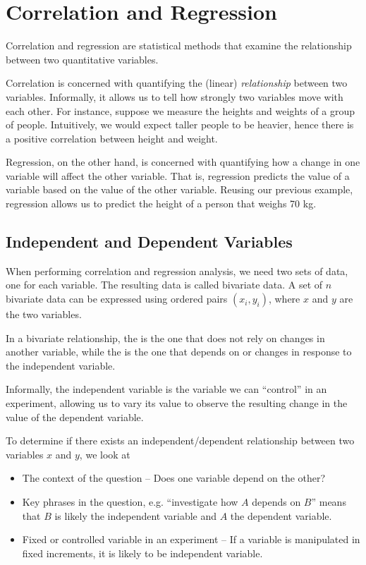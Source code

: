 \chapter{Correlation and Regression}

Correlation and regression are statistical methods that examine the relationship between two quantitative variables.

Correlation is concerned with quantifying the (linear) \emph{relationship} between two variables. Informally, it allows us to tell how strongly two variables move with each other. For instance, suppose we measure the heights and weights of a group of people. Intuitively, we would expect taller people to be heavier, hence there is a positive correlation between height and weight.

Regression, on the other hand, is concerned with quantifying how a change in one variable will affect the other variable. That is, regression predicts the value of a variable based on the value of the other variable. Reusing our previous example, regression allows us to predict the height of a person that weighs 70 kg.

\section{Independent and Dependent Variables}

When performing correlation and regression analysis, we need two sets of data, one for each variable. The resulting data is called bivariate data. A set of $n$ bivariate data can be expressed using ordered pairs $(x_i, y_i)$, where $x$ and $y$ are the two variables.

\begin{definition}
    In a bivariate relationship, the  is the one that does not rely on changes in another variable, while the  is the one that depends on or changes in response to the independent variable.
\end{definition}

Informally, the independent variable is the variable we can ``control'' in an experiment, allowing us to vary its value to observe the resulting change in the value of the dependent variable.

\begin{recipe}
    To determine if there exists an independent/dependent relationship between two variables $x$ and $y$, we look at
    \begin{itemize}
        \item The context of the question -- Does one variable depend on the other?
        \item Key phrases in the question, e.g. ``investigate how $A$ depends on $B$'' means that $B$ is likely the independent variable and $A$ the dependent variable.
        \item Fixed or controlled variable in an experiment -- If a variable is manipulated in fixed increments, it is likely to be independent variable.
    \end{itemize}
\end{recipe}

